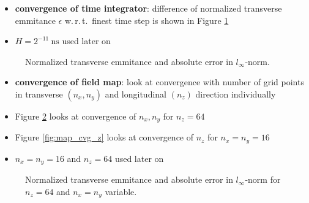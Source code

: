 \newpage

\begin{itemize}
   \item \textbf{convergence of time integrator}: difference of normalized transverse emmitance $\epsilon$ w.\,r.\,t.\ finest time step is shown in Figure \ref{fig:int_cvg}
   \item $H=2^{-11}\ \mathrm{ns}$ used later on
\end{itemize}

\begin{center}
\begin{figure}[H]
   \begin{subfigure}{0.4\textwidth}
      
   \end{subfigure}
   \qquad \qquad \qquad
   \begin{subfigure}{0.4\textwidth}
      
   \end{subfigure}
   \caption{Normalized transverse emmitance and absolute error in $l_\infty$-norm.}
   \label{fig:int_cvg}
\end{figure}
\end{center}

\begin{itemize}
   \item \textbf{convergence of field map}: look at convergence with number of grid points in transverse $(n_x, n_y)$ and longitudinal $(n_z)$ direction individually
   \item Figure \ref{fig:map_cvg_xy} looks at convergence of $n_x, n_y$ for $n_z=64$
   \item Figure \ref{fig:map_cvg_z} looks at convergence of $n_z$ for $n_x=n_y=16$
   \item $n_x=n_y=16$ and $n_z=64$ used later on
\end{itemize}

\begin{center}
\begin{figure}[H]
   \begin{subfigure}{0.4\textwidth}
      
   \end{subfigure}
   \qquad \qquad \qquad
   \begin{subfigure}{0.4\textwidth}
      
   \end{subfigure}
   \caption{Normalized transverse emmitance and absolute error in $l_\infty$-norm for $n_z=64$ and $n_x=n_y$ variable.}
   \label{fig:map_cvg_xy}
\end{figure}
\end{center}


